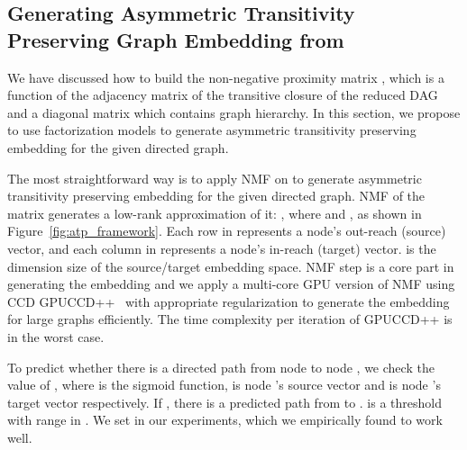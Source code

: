 \documentclass[letterpaper]{article} \usepackage{aaai19}  \usepackage{times}  \usepackage{helvet}  \usepackage{courier}  \usepackage{url}  \usepackage{graphicx}  \usepackage{booktabs} \usepackage{xcolor}
\begin{document}
\subsection{Generating Asymmetric Transitivity Preserving Graph Embedding from }
\label{sec:mf}
We have discussed how to build the non-negative proximity matrix , which is a function of the adjacency matrix of the transitive closure of the reduced DAG and a diagonal matrix which contains graph hierarchy. In this section, we propose to use factorization models to generate asymmetric transitivity preserving embedding for the given directed graph. 



The most straightforward way is to apply NMF on  to generate asymmetric transitivity preserving embedding for the given directed graph.
NMF of the  matrix  generates a low-rank approximation of it: , where  and , as shown in Figure~\ref{fig:atp_framework}.
Each row in  represents a node's out-reach (source) vector, and each column in  represents a node's in-reach (target) vector.  is the dimension size of the source/target embedding space. NMF step is a core part in generating the embedding and we apply a multi-core GPU version of NMF using CCD GPUCCD++~\cite{Nisa2017} with appropriate regularization to generate the embedding for large graphs efficiently. The time complexity per iteration of GPUCCD++ is   in the worst case. 

To predict whether there is a directed path from node  to node , we check the value of , where  is the sigmoid function,  is node 's source vector and  is node 's target vector respectively. If , there is a predicted path from  to .  is a threshold with range in . We set  in our experiments, which we empirically found to work well.
\end{document}
